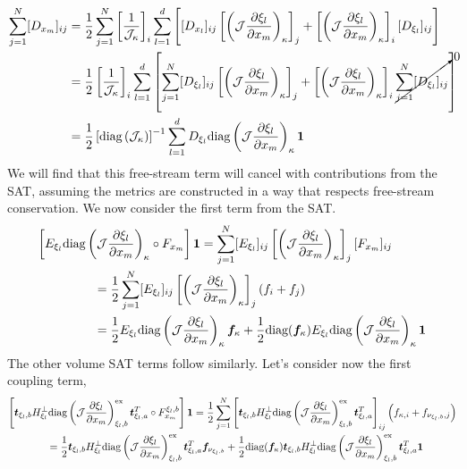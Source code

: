 \documentclass[12pt,a4paper]{article}
\newcommand{\pder}[2][]{\dfrac{\partial #1}{\partial #2}} %
\newcommand{\fn}[1]{\mathcal{#1}} %
\begin{document}
\begin{align*}
\sum_{j=1}^N [D_{x_m}]_{ij} &= \frac{1}{2} \sum_{j=1}^N \left[ \frac{1}{\fn{J}_\kappa} \right]_i \sum_{l=1}^d \left[ [D_{x_l}]_{ij} \left[ \left( \fn{J} \pder[\xi_l]{x_m} \right)_\kappa \right]_j + \left[ \left( \fn{J} \pder[\xi_l]{x_m} \right)_\kappa \right]_i  [ D_{\xi_l} ]_{ij} \right] \\
&= \frac{1}{2} \left[ \frac{1}{\fn{J}_\kappa} \right]_i \sum_{l=1}^d \left[ \sum_{j=1}^N [D_{\xi_l}]_{ij} \left[ \left( \fn{J} \pder[\xi_l]{x_m} \right)_\kappa \right]_j + \left[ \left( \fn{J} \pder[\xi_l]{x_m} \right)_\kappa \right]_i \cancelto{0}{\sum_{j=1}^N [ D_{\xi_l} ]_{ij}} \right] \\
&= \frac{1}{2}  \left[ \text{diag}\left( \fn{J}_\kappa \right) \right]^{-1} \sum_{l=1}^d  D_{\xi_l} \text{diag} \left( \fn{J} \pder[\xi_l]{x_m} \right)_\kappa \bm{1} 
\end{align*}
We will find that this free-stream term will cancel with contributions from the SAT, assuming the metrics are constructed in a way that respects free-stream conservation. We now consider the first term from the SAT.
\begin{align*}
\left[ E_{\xi_l} \text{diag}  \left( \fn{J} \pder[\xi_l]{x_m} \right)_{\kappa} \circ  F_{x_m}  \right] \bm{1} & = \sum_{j=1}^N [E_{\xi_l}]_{ij} \left[ \left( \fn{J} \pder[\xi_l]{x_m} \right)_{\kappa} \right]_{j} [ F_{x_m} ]_{ij} \\
& \hspace{-3cm} = \frac{1}{2}  \sum_{j=1}^N [E_{\xi_l}]_{ij} \left[ \left( \fn{J} \pder[\xi_l]{x_m} \right)_{\kappa} \right]_{j} (f_i + f_j) \\
& \hspace{-3cm} = \frac{1}{2} E_{\xi_l} \text{diag}  \left( \fn{J} \pder[\xi_l]{x_m} \right)_{\kappa} \bm{f}_\kappa + \frac{1}{2} \text{diag} (\bm{f}_\kappa)  E_{\xi_l} \text{diag}  \left( \fn{J} \pder[\xi_l]{x_m} \right)_{\kappa} \bm{1}
\end{align*}
The other volume SAT terms follow similarly. Let's consider now the first coupling term,
\begin{align*}
\left[ \bm{t}_{\xi_l, b} H^{\bot}_{\xi_l}  \text{diag} \left( \fn{J} \pder[\xi_l]{x_m} \right)_{\xi_l,b}^\text{ex} \bm{t}_{\xi_l, a}^T \circ F_{x_m}^{\xi_l , b} \right] \bm{1}
& =   \frac{1}{2} \sum_{j=1}^N \left[  \bm{t}_{\xi_l, b} H^{\bot}_{\xi_l}  \text{diag} \left( \fn{J} \pder[\xi_l]{x_m} \right)_{\xi_l,b}^\text{ex} \bm{t}_{\xi_l, a}^T  \right]_{ij}  \left( f_{\kappa,i} + f_{\nu_{\xi_l,b},j} \right) \\
& \hspace{-5cm} =  \frac{1}{2} \bm{t}_{\xi_l, b} H^{\bot}_{\xi_l}  \text{diag} \left( \fn{J} \pder[\xi_l]{x_m} \right)_{\xi_l,b}^\text{ex} \bm{t}_{\xi_l, a}^T \bm{f}_{\nu_{\xi_l,b}} + \frac{1}{2} \text{diag} (\bm{f}_\kappa)   \bm{t}_{\xi_l, b} H^{\bot}_{\xi_l}  \text{diag} \left( \fn{J} \pder[\xi_l]{x_m} \right)_{\xi_l,b}^\text{ex} \bm{t}_{\xi_l, a}^T \bm{1} 
\end{align*}
\end{document}

